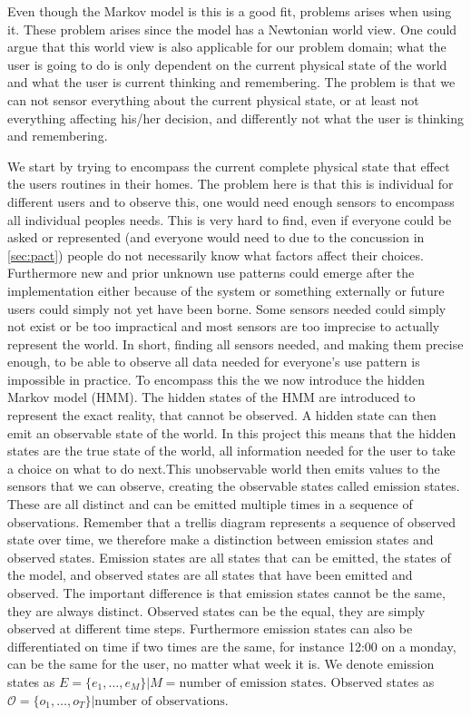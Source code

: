 Even though the Markov model is this is a good fit, problems arises when using it. These problem arises since the model has a Newtonian world view. One could argue that this world view is also applicable for our problem domain; what the user is going to do is only dependent on the current physical state of the world and what the user is current thinking and remembering. The problem is that we can not sensor everything about the current physical state, or at least not everything affecting his/her decision, and differently not what the user is thinking and remembering.

We start by trying to encompass the current complete physical state that effect the users routines in their homes. The problem here is that this is individual for different users and to observe this, one would need enough sensors to encompass all individual peoples needs. This is very hard to find, even if everyone could be asked or represented (and everyone would need to due to the concussion in \cref{sec:pact}) people do not necessarily know what factors affect their choices. Furthermore new and prior unknown use patterns could emerge after the implementation either because of the system or something externally or future users could simply not yet have been borne. Some sensors needed could simply not exist or be too impractical and most sensors are too imprecise to actually represent the world. In short, finding all sensors needed, and making them precise enough, to be able to observe all data needed for everyone’s use pattern is impossible in practice. To encompass this the we now introduce the hidden Markov model (HMM). The hidden states of the HMM are introduced to represent the exact reality, that cannot be observed. A hidden state can then emit an observable state of the world. In this project this means that the hidden states are the true state of the world, all information needed for the user to take a choice on what to do next.This unobservable world then emits values to the sensors that we can observe, creating the observable states called emission states. These are all distinct and can be emitted multiple times in a sequence of observations. Remember that a trellis diagram represents a sequence of observed state over time, we therefore make a distinction between emission states and observed states. Emission states are all states that can be emitted, the states of the model, and observed states are all states that have been emitted and observed. The important difference is that emission states cannot be the same, they are always distinct. Observed states can be the equal, they are simply observed at different time steps. Furthermore emission states can also be differentiated on time if two times are the same, for instance 12:00 on a monday, can be the same for the user, no matter what week it is. We denote emission states as $E=\{e_1, \dots ,e_{M}\}|M = \text{number of emission states}$. Observed states as $\mathcal{O}=\{o_1, \dots , o_T\}|\text{number of observations}$.

